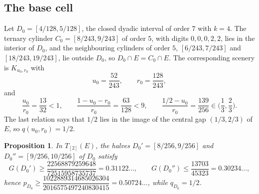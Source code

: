 \documentclass[11pt]{amsart}
\newtheorem{proposition}[theorem]{Proposition}
\theoremstyle{remark}
\begin{document}
\subsection*{The base cell}
Let $D_0=[4/128,5/128]$, the closed dyadic interval of order $7$ with $k=4$. The ternary cylinder $C_0=[8/243,9/243]$ of order $5$, with digits $0,0,0,2,2$, lies in the interior of $D_0$, and the neighbouring cylinders of order $5$, $[6/243,7/243]$ and $[18/243,19/243]$, lie outside $D_0$, so $D_0\cap E=C_0\cap E$. The corresponding scenery is $K_{u_0,r_0}$ with
\[
u_0=\frac{52}{243},\qquad r_0=\frac{128}{243},
\]
and
\begin{equation}\label{eq:margins0}
\frac{u_0}{r_0}=\frac{13}{32}<1,\qquad \frac{1-u_0-r_0}{r_0}=\frac{63}{128}<9,\qquad \frac{1/2-u_0}{r_0}=\frac{139}{256}\in\Big(\frac13,\frac23\Big).
\end{equation}
The last relation says that $1/2$ lies in the image of the central gap $(1/3,2/3)$ of $E$, so $q(u_0,r_0)=1/2$.

\begin{proposition}\label{prop:base}
In $T_{[2]}(E)$, the halves $D_0'=[8/256,9/256]$ and $D_0''=[9/256,10/256]$ of $D_0$ satisfy
\[
G(D_0')\ge\frac{22568879259648}{72515958735737}=0.31122\ldots,\qquad G(D_0'')\le\frac{13703}{45323}=0.30234\ldots,
\]
hence $p_{D_0}\ge \dfrac{1022889314685026304}{2016575497240830415}=0.50724\ldots$, while $q_{D_0}=1/2$.
\end{proposition}
\end{document}

